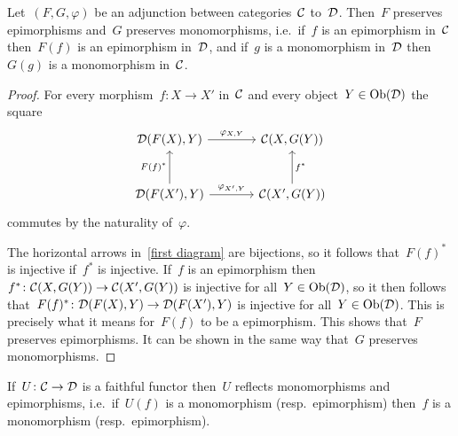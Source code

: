 \section{}




\subsection{}

\begin{lemma}
  \label{adjoint mono epi}
  Let~$(F, G, \varphi)$ be an adjunction between categories~$\mathcal{C}$ to~$\mathcal{D}$.
  Then~$F$ preserves epimorphisms and~$G$ preserves monomorphisms, i.e.\ if~$f$ is an epimorphism in~$\mathcal{C}$ then~$F(f)$ is an epimorphism in~$\mathcal{D}$, and if~$g$ is a monomorphism in~$\mathcal{D}$ then~$G(g)$ is a monomorphism in~$\mathcal{C}$.
\end{lemma}

\begin{proof}
      For every morphism~$f \colon X \to X'$ in~$\mathcal{C}$ and every object~$Y \in \operatorname{Ob}(\mathcal{D})$ the square
      \begin{equation}
        \label{first diagram}
        \begin{tikzcd}[sep = large]
            \Dcat(F(X), Y)
            \arrow{r}[above]{\varphi_{X,Y}}
          & \Ccat(X, G(Y))
          \\
            \Dcat(F(X'), Y)
            \arrow{u}[left]{F(f)^*}
            \arrow{r}[above]{\varphi_{X',Y}}
          & \Ccat(X', G(Y))
            \arrow{u}[right]{f^*}
        \end{tikzcd}
      \end{equation}
      commutes by the naturality of~$\varphi$.
      
      The horizontal arrows in~\eqref{first diagram} are bijections, so it follows that~$F(f)^*$ is injective if~$f^*$ is injective.
      If~$f$ is an epimorphism then~$f^* \colon \mathcal{C}(X, G(Y)) \to \mathcal{C}(X', G(Y))$ is injective for all~$Y \in \operatorname{Ob}(\mathcal{D})$, so it then follows that~$F(f)^* \colon \mathcal{D}(F(X), Y) \to \mathcal{D}(F(X'), Y)$ is injective for all~$Y \in \operatorname{Ob}(\mathcal{D})$.
      This is precisely what it means for~$F(f)$ to be a epimorphism.
      This shows that~$F$ preserves epimorphisms.
      It can be shown in the same way that~$G$ preserves monomorphisms.
\end{proof}


\begin{lemma}
  If~$U \colon \mathcal{C} \to \mathcal{D}$ is a faithful functor then~$U$ reflects monomorphisms and epimorphisms, i.e.\ if~$U(f)$ is a monomorphism (resp.\ epimorphism) then~$f$ is a monomorphism (resp.\ epimorphism).
\end{lemma}


